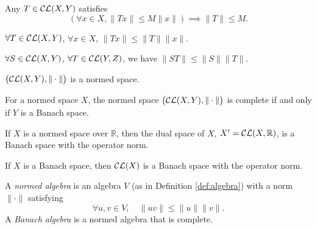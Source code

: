 \begin{lem}
  \label{lem:opNormIsLeastUpperBound}
  Any $T\in {\cal CL}(X,Y)$ satisfies 
  \begin{equation}
    \label{eq:opNormIsLeastUpperBound}
    \left(\forall x\in X, \|Tx\|\le M \|x\|\right)
     \implies \|T\|\le M.
  \end{equation}
\end{lem}

\begin{lem}
  \label{lem:TxNormLE-Tnorm-xnorm}
  $\forall T\in {\cal CL}(X,Y)$, $\forall x\in X$,
  $\|Tx\|\le \|T\|\|x\|$.
\end{lem}

\begin{lem}
  \label{lem:STNormLE-SnormTnorm}
  $\forall S\in {\cal CL}(X,Y)$,
  $\forall T\in {\cal CL}(Y,Z)$, 
  we have $\|ST\|\le \|S\|\|T\|$.
\end{lem}

\begin{thm}
  \label{thm:OpNormCLXY}
  $\bigl({\cal CL}(X,Y), \|\cdot\|\bigr)$ is a normed space.
\end{thm}

\begin{lem}
  \label{lem:YisBanachImpliesCLXYisBanach}
  For a normed space $X$,
  the normed space \mbox{$\bigl({\cal CL}(X,Y), \|\cdot\|\bigr)$} is complete
  if and only if $Y$ is a Banach space.
\end{lem}

\begin{coro}
  If $X$ is a normed space over $\mathbb{R}$,
  then the dual space of $X$, $X'={\cal CL}(X,\mathbb{R})$,
  is a Banach space with the operator norm.
\end{coro}

\begin{coro}
  \label{coro:XisBanachSoIsCLX}
  If $X$ is a Banach space,
  then ${\cal CL}(X)$ is a Banach space with the operator norm.
\end{coro}

\begin{defn}
  A \emph{normed algebra} is an algebra $V$ (as in Definition \ref{def:algebra})
  with a norm $\|\cdot\|$ satisfying
  \begin{equation}
    \label{eq:normedAlgebra}
    \forall u,v \in V,\quad \|uv\|\le \|u\|\|v\|.
  \end{equation}
  A \emph{Banach algebra} is a normed algebra that is complete.
\end{defn}

